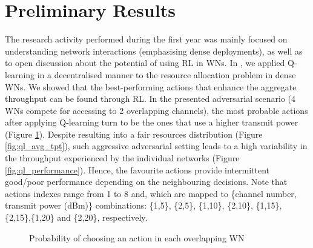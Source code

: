 \documentclass[12pt, a4paper,twoside]{tesi_upf}
\begin{document}
		\section{Preliminary Results}
		\label{section:preliminary_results}	
			The research activity performed during the first year was mainly focused on understanding network interactions (emphasising dense deployments), as well as to open discussion about the potential of using RL in WNs. In \cite{wilhelmi2017implications}, we applied Q-learning in a decentralised manner to the resource allocation problem in dense WNs. We showed that the best-performing actions that enhance the aggregate throughput can be found through RL. In the presented adversarial scenario (4 WNs compete for accessing to 2 overlapping channels), the most probable actions after applying Q-learning turn to be the ones that use a higher transmit power (Figure \ref{fig:ql_actions}). Despite resulting into a fair resources distribution (Figure \ref{fig:ql_avg_tpt}), such aggressive adversarial setting leads to a high variability in the throughput experienced by the individual networks (Figure \ref{fig:ql_performance}). Hence, the favourite actions provide intermittent good/poor performance depending on the neighbouring decisions. Note that actions indexes range from 1 to 8 and, which are mapped to \{channel number, transmit power (dBm)\} combinations: \{1,5\}, \{2,5\}, \{1,10\}, \{2,10\}, \{1,15\}, \{2,15\},\{1,20\} and \{2,20\}, respectively.	
			\begin{figure}[h!]
				\centering
				\caption{Probability of choosing an action in each overlapping WN \cite{wilhelmi2017implications}}
				\label{fig:ql_actions}
			\end{figure}
\end{document}
